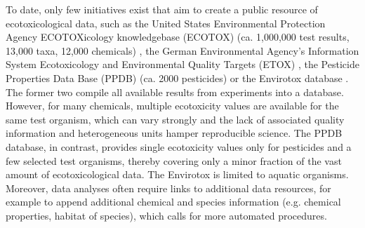 \documentclass[journal,datadescriptor,accept,moreauthors,pdftex]{Definitions/mdpi}
\begin{document}
To date, only few initiatives exist that aim to create a public resource of ecotoxicological data, such as the United States Environmental Protection Agency ECOTOXicology knowledgebase (ECOTOX) (ca. 1,000,000 test results, 13,000 taxa, 12,000 chemicals) \citep{elonen_ecotoxicology_2018}, the German Environmental Agency's Information System Ecotoxicology and Environmental Quality Targets (ETOX) \citep{umweltbundesamt_etox_2019}, the Pesticide Properties Data Base (PPDB) (ca. 2000 pesticides) \citep{lewis_international_2016} or the Envirotox database \citep{healthandenvironmentalsciencesinstitutehesi_envirotox_2019, connors_creation_2019}. The former two compile all available results from experiments into a database. However, for many chemicals, multiple ecotoxicity values are available for the same test organism, which can vary strongly and the lack of associated quality information and heterogeneous units hamper reproducible science. The PPDB database, in contrast, provides single ecotoxicity values only for pesticides and a few selected test organisms, thereby covering only a minor fraction of the vast amount of ecotoxicological data. The Envirotox is limited to aquatic organisms. Moreover, data analyses often require links to additional data resources, for example to append additional chemical and species information (e.g. chemical properties, habitat of species), which calls for more automated procedures. 
\end{document}
